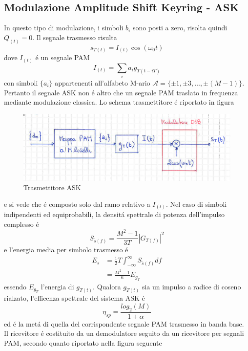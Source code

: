     \subsection{Modulazione Amplitude Shift Keyring - ASK}
        In questo tipo di modulazione, i simboli $b_i$ sono posti a zero, risolta quindi $Q_{(t)} = 0$. 
        Il segnale trasmesso risulta 
        \[
            s_{T(t)} = I_{(t)}\cos(\omega_0 t)
        \]
        dove $I_{(t)}$ é un segnale PAM
        \[
            I_{(t)} = \sum_{i}a_ig_{T(t-iT)}    
        \]
        con simboli $\{a_i\}$ appartenenti all'alfabeto M-ario $\mathcal{A} = \{\pm 1, \pm 3,\dots,\pm (M-1)\}$. Pertanto 
        il segnale ASK non é altro che un segnale PAM traslato in frequenza mediante modulazione classica. Lo schema trasmettitore 
        é riportato in figura 
        \begin{figure}[H]
            \centering
            \includegraphics[width = 12cm]{media/trasmettitore ask.png}
            \caption{Trasmettitore ASK}
        \end{figure}        
        e si vede che é composto solo dal ramo relativo a $I_{(t)}$. Nel caso di simboli indipendenti ed equiprobabili, la densitá 
        spettrale di potenza dell'impulso complesso é 
        \[
            S_{\tilde{s}(f)} = \frac{M^2-1}{3T}\left|G_{T(f)}\right|^2
        \]
        e l'energia media per simbolo trasmesso é 
        \begin{align}
            E_s &= \frac{1}{2}T\int_{-\infty}^{\infty}S_{\tilde{s}(f)}df\nonumber \\
                &= \frac{M^2-1}{6}E_{g_T}\nonumber
        \end{align}
        essendo $E_{g_T}$ l'energia di $g_{T(t)}$. Qualora $g_{T(t)}$ sia un impulso a radice di coseno rialzato, l'efficenza spettrale
        del sistema ASK é 
        \[
            \eta_{sp} = \frac{log_2(M)}{1+\alpha}    
        \]
        ed é la metá di quella del corrispondente segnale PAM trasmesso in banda base. Il ricevitore é costituito da un demodulatore seguito da 
        un ricevitore per segnali PAM, secondo quanto riportato nella figura seguente
